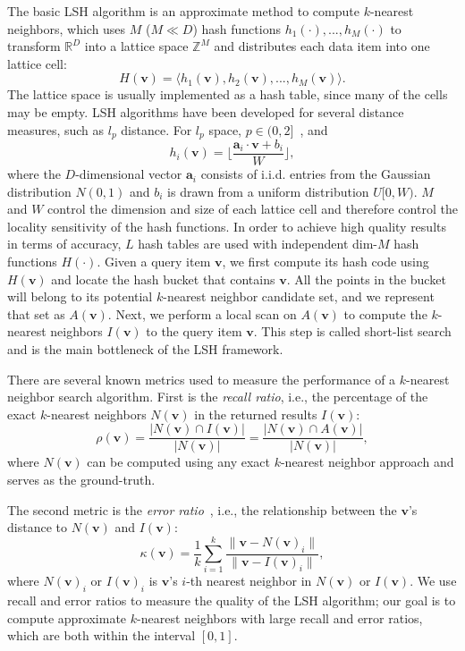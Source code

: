 The basic LSH algorithm is an approximate method to compute $k$-nearest neighbors, which uses $M$ ($M \ll D$) hash functions $h_1(\cdot), ..., h_M(\cdot)$ to transform $\mathbb{R}^D$ into a lattice space $\mathbb{Z}^M$ and distributes each data item into one lattice cell:
\begin{equation}
H(\mathbf v) = \langle h_1(\mathbf v), h_2(\mathbf v), ..., h_M(\mathbf v) \rangle.
\end{equation}
The lattice space is usually implemented as a hash table, since many of the cells may be empty. LSH algorithms have been developed for several distance measures, such as $l_p$ distance. For $l_p$ space, $p \in (0, 2]$~\cite{Datar:2004:LHS}, and
\begin{equation}
\label{eq:6:hash:basic}
h_i(\mathbf v) = \lfloor \frac{\mathbf a_i \cdot \mathbf v + b_i}{W} \rfloor,
\end{equation}
where the $D$-dimensional vector $\mathbf a_i$ consists of i.i.d. entries from the Gaussian distribution $N(0, 1)$ and $b_i$ is drawn from a uniform distribution $U[0, W)$. $M$ and $W$ control the dimension and size of each lattice cell and therefore control the locality sensitivity of the hash functions.
In order to achieve high quality results in terms of accuracy, $L$ hash tables are used with independent dim-$M$ hash functions $H(\cdot)$. Given a query item $\mathbf v$, we first compute its hash code using $H(\mathbf v)$ and locate the hash bucket that contains $\mathbf v$. All the points in the bucket will belong to its potential $k$-nearest neighbor candidate set, and we represent that set as $A(\mathbf v)$. Next, we perform a local scan on $A(\mathbf v)$ to compute the $k$-nearest neighbors $I(\mathbf v)$ to the query item $\mathbf v$. This step is called short-list search and is the main bottleneck of the LSH framework.

There are several known metrics used to measure the performance of a $k$-nearest neighbor search algorithm. First is the \emph{recall ratio}, i.e., the percentage of the exact $k$-nearest neighbors $N(\mathbf v)$ in the returned results $I(\mathbf v)$:
\begin{equation}
\label{eq:6:recall}
\rho(\mathbf v) = \frac{|N(\mathbf v) \cap I(\mathbf v)|}{|N(\mathbf v)|} = \frac{|N(\mathbf v) \cap A(\mathbf v)|}{|N(\mathbf v)|},
\end{equation}
where $N(\mathbf v)$ can be computed using any exact $k$-nearest neighbor approach and serves as the ground-truth.

The second metric is the \emph{error ratio}~\cite{Gionis:vldb:99}, i.e., the relationship between the $\mathbf v$'s distance to $N(\mathbf v)$ and $I(\mathbf v)$:
\begin{equation}
\label{eq:6:error}
\kappa(\mathbf v) = \frac{1}{k} \sum_{i=1}^k \frac{\|\mathbf v -N(\mathbf v)_i\|}{\| \mathbf v - I(\mathbf v)_i\|},
\end{equation}
where $N(\mathbf v)_i$ or $I(\mathbf v)_i$ is $\mathbf v$'s $i$-th nearest neighbor in $N(\mathbf v)$ or $I(\mathbf v)$. We use recall and error ratios to measure the quality of the LSH algorithm; our goal is to compute approximate $k$-nearest neighbors with large recall and error ratios, which are both within the interval $[0, 1]$.

